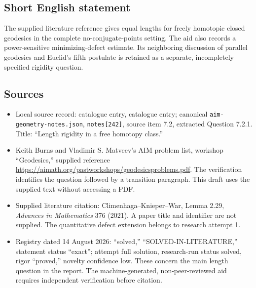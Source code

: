 \documentclass[11pt]{article}
\begin{document}
\subsection{Short English statement}
The supplied literature reference gives equal lengths for freely homotopic closed geodesics in the complete no-conjugate-points setting. The aid also records a power-sensitive minimizing-defect estimate. Its neighboring discussion of parallel geodesics and Euclid's fifth postulate is retained as a separate, incompletely specified rigidity question.
\subsection{Sources}
\begin{itemize}
\item Local source record: catalogue entry, catalogue entry; canonical \texttt{aim-geometry-notes.json}, \texttt{notes[242]}, source item 7.2, extracted Question 7.2.1. Title: ``Length rigidity in a free homotopy class.''
\item Keith Burns and Vladimir S. Matveev's AIM problem list, workshop ``Geodesics,'' supplied reference \url{https://aimath.org/pastworkshops/geodesicsproblems.pdf}. The verification identifies the question followed by a transition paragraph. This draft uses the supplied text without accessing a PDF.
\item Supplied literature citation: Climenhaga--Knieper--War, Lemma 2.29, \emph{Advances in Mathematics} 376 (2021). A paper title and identifier are not supplied. The quantitative defect extension belongs to research attempt 1.
\item Registry dated 14 August 2026: ``solved,'' ``SOLVED-IN-LITERATURE,'' statement status ``exact''; attempt full solution, research-run status solved, rigor ``proved,'' novelty confidence low. These concern the main length question in the report. The machine-generated, non-peer-reviewed aid requires independent verification before citation.
\end{itemize}
\end{document}
